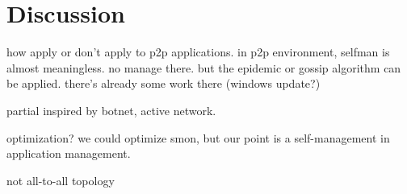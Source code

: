 \section{Discussion}
\label{sec:discuss}

how apply or don't apply to p2p applications. in p2p
environment, selfman is almost meaningless. no manage there. but
the epidemic or gossip algorithm can be applied. there's already
some work there (windows update?)

partial inspired by botnet, active network.

optimization? we could optimize smon, but our point is a
self-management in application management.

not all-to-all topology
